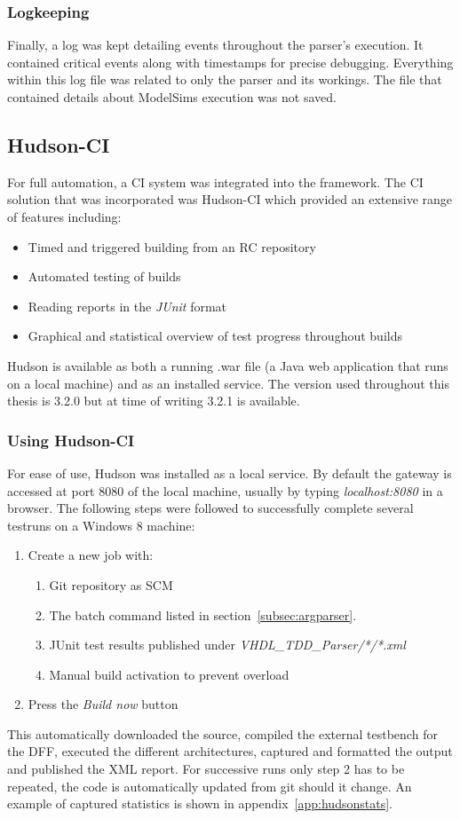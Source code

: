 \documentclass[11pt,british]{article}
\begin{document}
\subsubsection{Logkeeping}
Finally, a log was kept detailing events throughout the parser's execution. It contained critical events along with timestamps for precise debugging. Everything within this log file was related to only the parser and its workings. The file that contained details about ModelSims execution was not saved.

\subsection{Hudson-CI}
\label{subsec:Hudson}
For full automation, a \gls{CI} system was integrated into the framework. The \gls{CI} solution that was incorporated was Hudson-CI which provided an extensive range of features including:
\begin{itemize}%
\item Timed and triggered building from an \gls{RC} repository
\item Automated testing of builds
\item Reading reports in the \emph{JUnit} format
\item Graphical and statistical overview of test progress throughout builds
\end{itemize}
Hudson is available as both a running .war file (a Java web application that runs on a local machine) and as an installed service.\cite{hudson} The version used throughout this thesis is 3.2.0 but at time of writing 3.2.1 is available.

\subsubsection{Using Hudson-CI}
For ease of use, Hudson was installed as a local service. By default the gateway is accessed at port 8080 of the local machine, usually by typing \emph{localhost:8080} in a browser. The following steps were followed to successfully complete several testruns on a Windows 8 machine:
\begin{enumerate}
\item Create a new job with:
\begin{enumerate}
\item Git repository as SCM
\item The batch command listed in section~\ref{subsec:argparser}.
\item JUnit test results published under \emph{VHDL\_TDD\_Parser/*/*.xml}
\item Manual build activation to prevent overload
\end{enumerate}
\item Press the \emph{Build now} button
\end{enumerate}
This automatically downloaded the source, compiled the external testbench for the \gls{DFF}, executed the different architectures, captured and formatted the output and published the \gls{XML} report. For successive runs only step 2 has to be repeated, the code is automatically updated from git should it change. An example of captured statistics is shown in appendix~\ref{app:hudsonstats}.
\end{document}
